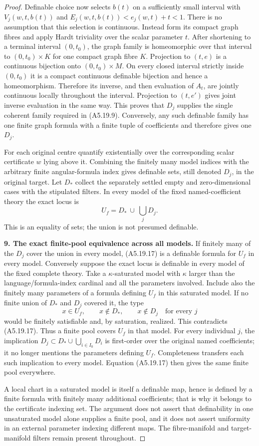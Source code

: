 \begin{proof}
Definable choice now selects $b(t)$ on a sufficiently small interval with
$V_j(w,t,b(t))$ and $E_j(w,t,b(t))<e_j(w,t)+t<1$.
There is no assumption that this selection is continuous. Instead form
its compact graph fibres and apply Hardt triviality over the scalar
parameter $t$. After shortening to a terminal interval $(0,t_0)$, the
graph family is homeomorphic over that interval to $(0,t_0)\times K$
for one compact graph fibre $K$. Projection to $(t,e)$ is a continuous
bijection onto $(0,t_0)\times M$. On every closed interval strictly
inside $(0,t_0)$ it is a compact continuous definable bijection and hence
a homeomorphism. Therefore its inverse, and then evaluation of $A_t$,
are jointly continuous locally throughout the interval. Projection to
$(t,e')$ gives joint inverse evaluation in the same way. This proves
that $D_j$ supplies the single coherent family required in (A5.19.9).
Conversely, any such definable family has one finite graph formula with
a finite tuple of coefficients and therefore gives one $D_j$.

For each original centre quantify existentially over the corresponding
scalar certificate $w$ lying above it. Combining the finitely many model
indices with the arbitrary finite angular-formula index gives definable
sets, still denoted $D_j$, in the original target. Let $D_*$ collect the
separately settled empty and zero-dimensional cases with the stipulated
filters. In every model of the fixed named-coefficient theory the exact
locus is
\[
 U_f=D_*\ \cup\ \bigcup_j D_j.
 \tag{A5.19.17}
\]
This is an equality of sets; the union is not presumed definable.

\textbf{9. The exact finite-pool equivalence across all models.}\quad
If finitely many of the $D_j$ cover the union in every model, (A5.19.17)
is a definable formula for $U_f$ in every model.
Conversely suppose the exact locus is definable in every model of the
fixed complete theory. Take a $\kappa$-saturated model with
$\kappa$ larger than the language/formula-index cardinal and all the
parameters involved. Include also the finitely many parameters of a
formula defining $U_f$ in this saturated model. If no finite union of
$D_*$ and $D_j$ covered it, the type
\[
 x\in U_f,\qquad x\notin D_*,\qquad x\notin D_j\quad\text{for every }j
\]
would be finitely satisfiable and, by saturation, realized. This
contradicts (A5.19.17). Thus a finite pool covers $U_f$ in that model.
For every individual $j$, the implication
$D_j\subset D_*\cup\bigcup_{i\in I_0}D_i$ is first-order over the original
named coefficients; it no longer mentions the parameters defining $U_f$.
Completeness transfers each such implication to every model. Equation
(A5.19.17) then gives the same finite pool everywhere.

A local chart in a saturated model is itself a definable map, hence is
defined by a finite formula with finitely many additional coefficients;
that is why it belongs to the certificate indexing set. The argument does
not assert that definability in one unsaturated model alone supplies a
finite pool, and it does not assert uniformity in an external parameter
indexing different maps. The fibre-manifold and target-manifold filters
remain present throughout.
\end{proof}

